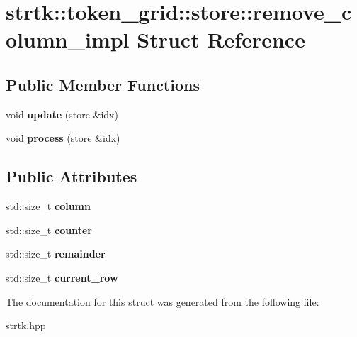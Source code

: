 \hypertarget{structstrtk_1_1token__grid_1_1store_1_1remove__column__impl}{\section{strtk\-:\-:token\-\_\-grid\-:\-:store\-:\-:remove\-\_\-column\-\_\-impl Struct Reference}
\label{structstrtk_1_1token__grid_1_1store_1_1remove__column__impl}
}
\subsection*{Public Member Functions}
\begin{DoxyCompactItemize}
\item 
\hypertarget{structstrtk_1_1token__grid_1_1store_1_1remove__column__impl_ab8c202f649b03e757fda440d9bf4677f}{void {\bfseries update} (store \&idx)}\label{structstrtk_1_1token__grid_1_1store_1_1remove__column__impl_ab8c202f649b03e757fda440d9bf4677f}

\item 
\hypertarget{structstrtk_1_1token__grid_1_1store_1_1remove__column__impl_a46b2200bc04cd826213519487484dee0}{void {\bfseries process} (store \&idx)}\label{structstrtk_1_1token__grid_1_1store_1_1remove__column__impl_a46b2200bc04cd826213519487484dee0}

\end{DoxyCompactItemize}
\subsection*{Public Attributes}
\begin{DoxyCompactItemize}
\item 
\hypertarget{structstrtk_1_1token__grid_1_1store_1_1remove__column__impl_a8caec52a8a931cdf22e177da5575ebb6}{std\-::size\-\_\-t {\bfseries column}}\label{structstrtk_1_1token__grid_1_1store_1_1remove__column__impl_a8caec52a8a931cdf22e177da5575ebb6}

\item 
\hypertarget{structstrtk_1_1token__grid_1_1store_1_1remove__column__impl_a13d21677fb89d1684630048c60b12d8e}{std\-::size\-\_\-t {\bfseries counter}}\label{structstrtk_1_1token__grid_1_1store_1_1remove__column__impl_a13d21677fb89d1684630048c60b12d8e}

\item 
\hypertarget{structstrtk_1_1token__grid_1_1store_1_1remove__column__impl_ad292ad299ed344f77ea48beced6ae5ed}{std\-::size\-\_\-t {\bfseries remainder}}\label{structstrtk_1_1token__grid_1_1store_1_1remove__column__impl_ad292ad299ed344f77ea48beced6ae5ed}

\item 
\hypertarget{structstrtk_1_1token__grid_1_1store_1_1remove__column__impl_a39de5406d4acd7286637ecb870cb5728}{std\-::size\-\_\-t {\bfseries current\-\_\-row}}\label{structstrtk_1_1token__grid_1_1store_1_1remove__column__impl_a39de5406d4acd7286637ecb870cb5728}

\end{DoxyCompactItemize}


The documentation for this struct was generated from the following file\-:\begin{DoxyCompactItemize}
\item 
strtk.\-hpp\end{DoxyCompactItemize}
